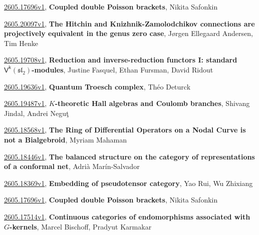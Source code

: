 \documentclass[9pt, a4paper]{article}
\theoremstyle{plain}
\theoremstyle{definition}
\theoremstyle{remark}
\newcommand{\arxiv}[3]{\href{https://arxiv.org/abs/#1}{#1}, \textbf{\textcolor{arxivblue}{#2}}, #3}
\begin{document}
\arxiv{2605.17696v1}{Coupled double Poisson brackets}{Nikita Safonkin}

\arxiv{2605.20097v1}{The Hitchin and Knizhnik-Zamolodchikov connections are projectively equivalent in the genus zero case}{Jørgen Ellegaard Andersen, Tim Henke}

\arxiv{2605.19708v1}{Reduction and inverse-reduction functors I: standard $\mathsf{V^k}(\mathfrak{sl}_2)$-modules}{Justine Fasquel, Ethan Fursman, David Ridout}

\arxiv{2605.19636v1}{Quantum Troesch complex}{Théo Deturck}

\arxiv{2605.19487v1}{$K$-theoretic Hall algebras and Coulomb branches}{Shivang Jindal, Andrei Neguţ}

\arxiv{2605.18568v1}{The Ring of Differential Operators on a Nodal Curve is not a Bialgebroid}{Myriam Mahaman}

\arxiv{2605.18446v1}{The balanced structure on the category of representations of a conformal net}{Adrià Marín-Salvador}

\arxiv{2605.18369v1}{Embedding of pseudotensor category}{Yao Rui, Wu Zhixiang}

\arxiv{2605.17696v1}{Coupled double Poisson brackets}{Nikita Safonkin}

\arxiv{2605.17514v1}{Continuous categories of endomorphisms associated with $G$-kernels}{Marcel Bischoff, Pradyut Karmakar}

\end{document}
